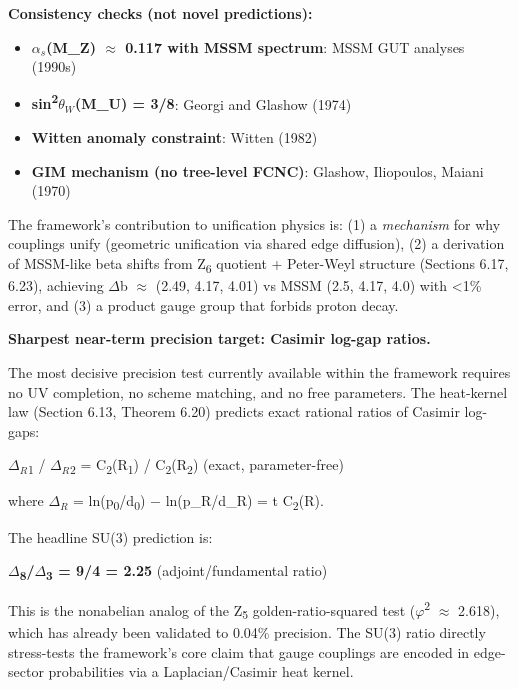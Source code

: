 \documentclass[11pt,a4paper]{article}
\theoremstyle{remark}
\providecommand{\tightlist}{%
  \setlength{\itemsep}{0pt}\setlength{\parskip}{0pt}}
\begin{document}
\textbf{Consistency checks (not novel predictions):}

\begin{itemize}
\tightlist
\item
  \textbf{$\alpha_s$(M\_Z) \ensuremath{\approx} 0.117 with MSSM spectrum}: MSSM GUT analyses (1990s)
\item
  \textbf{sin\textsuperscript{2}$\theta_W$(M\_U) = 3/8}: Georgi and Glashow (1974)
\item
  \textbf{Witten anomaly constraint}: Witten (1982)
\item
  \textbf{GIM mechanism (no tree-level FCNC)}: Glashow, Iliopoulos, Maiani (1970)
\end{itemize}

The framework's contribution to unification physics is: (1) a \emph{mechanism} for
why couplings unify (geometric unification via shared edge diffusion), (2) a
derivation of MSSM-like beta shifts from Z\textsubscript{6} quotient + Peter-Weyl structure
(Sections 6.17, 6.23), achieving \ensuremath{\Delta}b \ensuremath{\approx} (2.49, 4.17, 4.01) vs MSSM (2.5, 4.17, 4.0)
with \textless1\% error, and (3) a product gauge group that forbids proton decay.

\textbf{Sharpest near-term precision target: Casimir log-gap ratios.}

The most decisive precision test currently available within the framework requires no UV completion, no scheme matching, and no free parameters. The heat-kernel law (Section 6.13, Theorem 6.20) predicts exact rational ratios of Casimir log-gaps:

$\Delta_R$\textsubscript{1} / $\Delta_R$\textsubscript{2} = C\textsubscript{2}(R\textsubscript{1}) / C\textsubscript{2}(R\textsubscript{2}) (exact, parameter-free)

where $\Delta_R$ = ln(p\textsubscript{0}/d\textsubscript{0}) \ensuremath{-} ln(p\_R/d\_R) = t C\textsubscript{2}(R).

The headline SU(3) prediction is:

\textbf{\ensuremath{\Delta}\textsubscript{8}/\ensuremath{\Delta}\textsubscript{3} = 9/4 = 2.25} (adjoint/fundamental ratio)

This is the nonabelian analog of the Z\textsubscript{5} golden-ratio-squared test
(\ensuremath{\varphi}\textsuperscript{2} \ensuremath{\approx} 2.618), which has already been validated to 0.04\% precision.
The SU(3) ratio directly stress-tests the framework's core claim that gauge
couplings are encoded in edge-sector probabilities via a Laplacian/Casimir
heat kernel.
\end{document}
